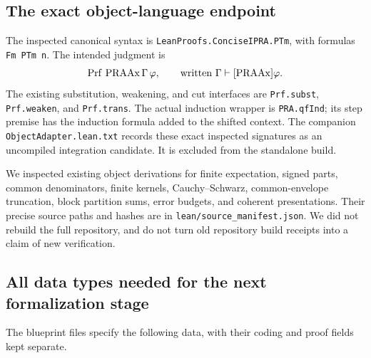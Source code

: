 \subsection{The exact object-language endpoint}

The inspected canonical syntax is
\texttt{LeanProofs.ConciseIPRA.PTm}, with formulas
\texttt{Fm PTm n}. The intended judgment is
\[
 \operatorname{Prf}\,\mathrm{PRAAx}\,\Gamma\,\varphi,
 \qquad\text{written }\Gamma\vdash[\mathrm{PRAAx}]\varphi.
\]
The existing substitution, weakening, and cut interfaces are
\texttt{Prf.subst}, \texttt{Prf.weaken}, and \texttt{Prf.trans}.
The actual induction wrapper is \texttt{PRA.qfInd}; its step premise
has the induction formula added to the shifted context. The companion
\texttt{ObjectAdapter.lean.txt} records these exact inspected signatures
as an uncompiled integration candidate. It is excluded from the
standalone build.

We inspected existing object derivations for finite expectation,
signed parts, common denominators, finite kernels, Cauchy--Schwarz,
common-envelope truncation, block partition sums, error budgets, and
coherent presentations. Their precise source paths and hashes are
in \texttt{lean/source\_manifest.json}. We did not rebuild the full
repository, and do not turn old repository build receipts into a claim
of new verification.

\subsection{All data types needed for the next formalization stage}

The blueprint files specify the following data, with their coding and
proof fields kept separate.

